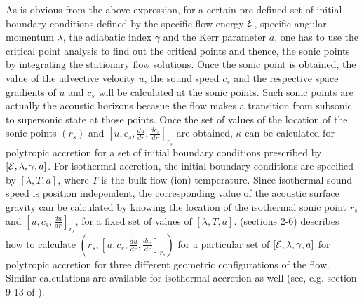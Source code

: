 \documentclass[10pt,authoryear]{article}
\begin{document}
As is obvious from the above expression, for a certain pre-defined set of initial boundary conditions defined by 
the specific flow energy ${\cal E}$, specific angular momentum $\lambda$, the adiabatic index $\gamma$ and the Kerr parameter $a$, 
one has to use the critical point analysis to find out the critical points and thence, the sonic points by integrating the stationary 
flow solutions. Once the sonic point is obtained, the value of the advective velocity $u$, the sound speed $c_s$ and 
the respective space gradients of $u$ and $c_s$ will be calculated at the sonic points. 
Such sonic points are actually the acoustic horizons becasue the flow makes a transition from subsonic to supersonic state 
at those points. Once the set of values of the location of the sonic points $(r_s)$ and $\left[u,c_s,\frac{du}{dr},\frac{dc_s}{dr}\right]_{r_s}$ 
are obtained, $\kappa$ can be calculated for polytropic accretion for a set of initial boundary conditions prescribed by 
$\left[{\cal E},\lambda,\gamma,a\right]$. For isothermal accretion, the initial boundary conditions are specified by 
$\left[\lambda,T,a\right]$, where $T$ is the bulk flow (ion) temperature. Since isothermal sound speed is position independent, 
the corresponding value of the acoustic surface gravity can be calculated by knowing the location of the isothermal sonic point $r_s$ and 
$\left[u,c_s,\frac{du}{dr}\right]_{r_s}$, for a fixed set of values of $\left[\lambda,T,a\right]$. \cite{tbnd17na}(sections 2-6)
describes how to calculate $\left(r_s,\left[u,c_s,\frac{du}{dr},\frac{dc_s}{dr}\right]_{r_s}\right)$ for a particular set of 
$\left[{\cal E},\lambda,\gamma,a\right]$ for polytropic accretion for three different geometric configurations of the flow. 
Similar calculations are available for isothermal accretion as well (see, e.g. section 9-13 of \cite{tbnd17na}). \\
\end{document}
